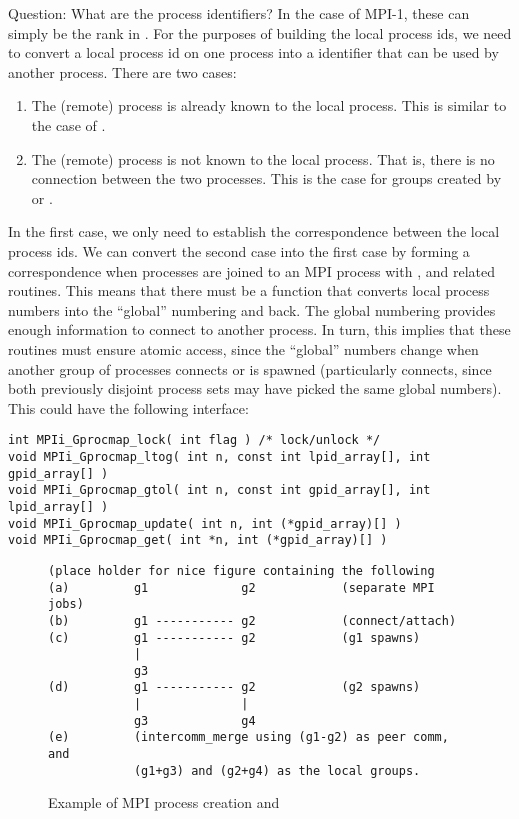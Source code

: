 \documentclass{article}
\begin{document}
Question: What are the process identifiers?  In the case of MPI-1, 
these can simply be the rank in .  For the
purposes of building the local process ids, we need to convert a local
process id on one process into a identifier that can be used by
another process.  There are two cases:
\begin{enumerate}
\item The (remote) process is already known to the local process.
This is similar to the case of .
\item The (remote) process is not known to the local process.  That
is, there is no connection between the two processes.  This is the
case for groups created by  or
. 
\end{enumerate}
In the first case, we only need to establish the correspondence
between the local process ids.  
We can convert the second case into the first case by forming a
correspondence when processes are joined to an MPI process with 
,  and related
routines.  This means that there must be a function that converts local
process numbers into the ``global'' numbering and back.  The global
numbering provides enough information to connect to another process.
In turn, this implies that these routines must ensure atomic access,
since the ``global'' numbers change when another group of processes
connects or is spawned (particularly connects, since both previously
disjoint process sets may have picked the same global numbers).
This could have the following
interface: 
\begin{verbatim}
int MPIi_Gprocmap_lock( int flag ) /* lock/unlock */
void MPIi_Gprocmap_ltog( int n, const int lpid_array[], int gpid_array[] )
void MPIi_Gprocmap_gtol( int n, const int gpid_array[], int lpid_array[] )
void MPIi_Gprocmap_update( int n, int (*gpid_array)[] )
void MPIi_Gprocmap_get( int *n, int (*gpid_array)[] )
\end{verbatim}

\begin{figure}
\begin{verbatim}
(place holder for nice figure containing the following
(a)         g1             g2            (separate MPI jobs)
(b)         g1 ----------- g2            (connect/attach)
(c)         g1 ----------- g2            (g1 spawns)
            |
            g3
(d)         g1 ----------- g2            (g2 spawns)
            |              |
            g3             g4
(e)         (intercomm_merge using (g1-g2) as peer comm, and 
            (g1+g3) and (g2+g4) as the local groups.
\end{verbatim}
\caption{Example of MPI process creation and
}\label{fig:spawn-ic} 
\end{figure}
\end{document}

